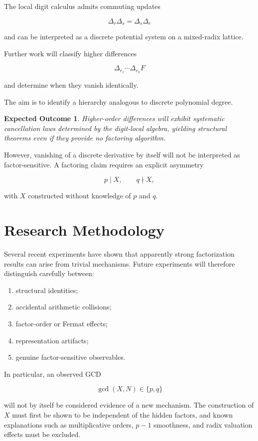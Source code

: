 \documentclass[11pt]{article}
\newtheorem{expectation}{Expected Outcome}
\begin{document}
The local digit calculus admits commuting updates

$$
\Delta_r\Delta_s
=
\Delta_s\Delta_r
$$

and can be interpreted as a discrete potential system on a mixed-radix lattice.

Further work will classify higher differences

$$
\Delta_{r_1}\cdots\Delta_{r_k}F
$$

and determine when they vanish identically.

The aim is to identify a hierarchy analogous to discrete polynomial degree.

\begin{expectation}
Higher-order differences will exhibit systematic cancellation laws determined by the digit-local algebra, yielding structural theorems even if they provide no factoring algorithm.
\end{expectation}

However, vanishing of a discrete derivative by itself will not be interpreted as factor-sensitive. A factoring claim requires an explicit asymmetry

$$
p\mid X,
\qquad
q\nmid X,
$$

with $X$ constructed without knowledge of $p$ and $q$.

\section{Research Methodology}

Several recent experiments have shown that apparently strong factorization results can arise from trivial mechanisms. Future experiments will therefore distinguish carefully between:

\begin{enumerate}[label=(\roman*)]
\item structural identities;
\item accidental arithmetic collisions;
\item factor-order or Fermat effects;
\item representation artifacts;
\item genuine factor-sensitive observables.
\end{enumerate}

In particular, an observed GCD

$$
\gcd(X,N)\in\{p,q\}
$$

will not by itself be considered evidence of a new mechanism. The construction of $X$ must first be shown to be independent of the hidden factors, and known explanations such as multiplicative orders, $p-1$ smoothness, and radix valuation effects must be excluded.
\end{document}
